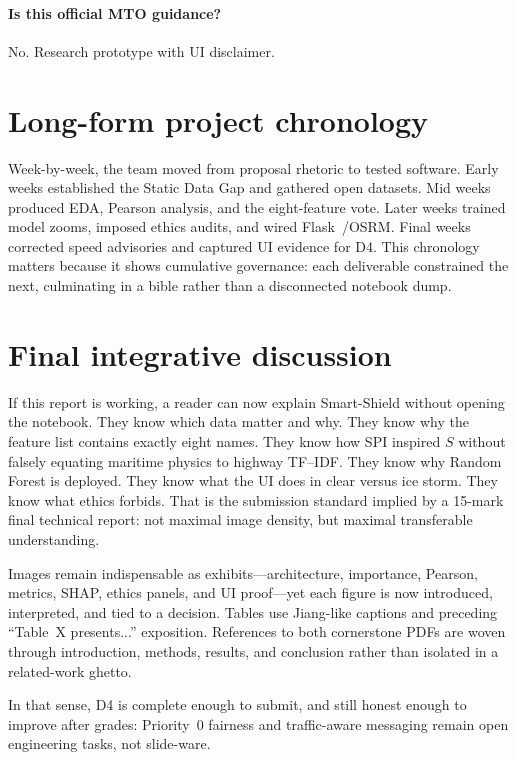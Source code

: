 \documentclass[11pt,a4paper]{article}
\begin{document}
\paragraph{Is this official MTO guidance?}
No. Research prototype with UI disclaimer.

\newpage
\section*{Long-form project chronology}
Week-by-week, the team moved from proposal rhetoric to tested software. Early weeks established the Static Data Gap and gathered open datasets. Mid weeks produced EDA, Pearson analysis, and the eight-feature vote. Later weeks trained model zooms, imposed ethics audits, and wired Flask~/OSRM. Final weeks corrected speed advisories and captured UI evidence for D4. This chronology matters because it shows cumulative governance: each deliverable constrained the next, culminating in a bible rather than a disconnected notebook dump.

\newpage
\section*{Final integrative discussion}
\label{sec:finaldisc}
If this report is working, a reader can now explain Smart-Shield without opening the notebook. They know which data matter and why. They know why the feature list contains exactly eight names. They know how SPI inspired $S$ without falsely equating maritime physics to highway TF--IDF. They know why Random Forest is deployed. They know what the UI does in clear versus ice storm. They know what ethics forbids. That is the submission standard implied by a 15-mark final technical report: not maximal image density, but maximal transferable understanding.

Images remain indispensable as exhibits---architecture, importance, Pearson, metrics, SHAP, ethics panels, and UI proof---yet each figure is now introduced, interpreted, and tied to a decision. Tables use Jiang-like captions and preceding ``Table~X presents...'' exposition. References to both cornerstone PDFs are woven through introduction, methods, results, and conclusion rather than isolated in a related-work ghetto.

In that sense, D4 is complete enough to submit, and still honest enough to improve after grades: Priority~0 fairness and traffic-aware messaging remain open engineering tasks, not slide-ware.
\end{document}
